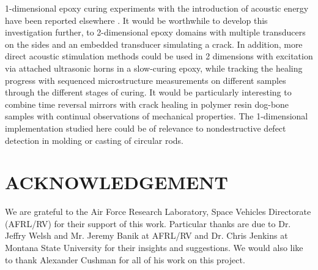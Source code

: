 \documentclass[11pt,letterpaper]{article}%
\begin{document}
1-dimensional epoxy curing experiments with the introduction of acoustic energy have been reported elsewhere \cite{fehrman}.
It would be worthwhile to develop this investigation further, to
2-dimensional epoxy domains with multiple transducers on the sides
and an embedded transducer simulating a crack.  In addition, more
direct acoustic stimulation methods could be used in 2 dimensions
with excitation via attached ultrasonic horns in a slow-curing
epoxy, while tracking the healing progress with sequenced
microstructure measurements on different samples through the
different stages of curing.  It would be particularly interesting
to combine time reversal mirrors with crack healing in polymer
resin dog-bone samples with continual observations of mechanical
properties.  The 1-dimensional implementation studied here could
be of relevance to nondestructive defect detection in molding or
casting of circular rods.

\section*{ACKNOWLEDGEMENT}

We are grateful to the Air Force Research Laboratory, Space
Vehicles Directorate (AFRL/RV) for their support of this work.
Particular thanks are due to Dr. Jeffry Welsh and Mr. Jeremy Banik
at AFRL/RV and Dr. Chris Jenkins at Montana State University for
their insights and suggestions. We would also like to thank Alexander Cushman for all of his work on this project.




\end{document}
